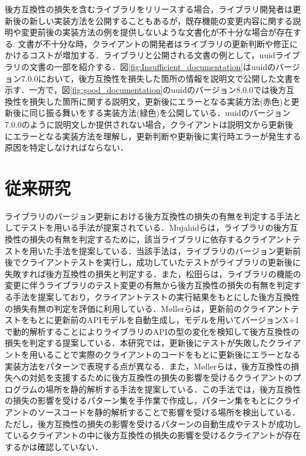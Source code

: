\documentclass[11pt]{jreport}
\begin{document}
後方互換性の損失を含むライブラリをリリースする場合，ライブラリ開発者は更新後の新しい実装方法を公開することもあるが，既存機能の変更内容に関する説明や変更前後の実装方法の例を提供しないような文書化が不十分な場合が存在する.
文書が不十分な時，クライアントの開発者はライブラリの更新判断や修正にかけるコストが増加する\cite{mostafa2017experience}．ライブラリと公開される文書の例として，uuidライブラリの文書の一部を紹介する．図\ref{fig:Insufficient_documentation}はuuidのバージョン7.0.0において，後方互換性を損失した箇所の情報を説明文で公開した文書を示す．一方で，図\ref{fig:good_documentation}のuuidのバージョン8.0.0では後方互換性を損失した箇所に関する説明文，更新後にエラーとなる実装方法(赤色)と更新後に同じ振る舞いをする実装方法(緑色)を公開している．uuidのバージョン7.0.0のように説明文しか提供されない場合，クライアントは説明文から更新後にエラーとなる実装方法を理解し，更新判断や更新後に実行時エラーが発生する原因を特定しなければならない．


\section{従来研究}

ライブラリのバージョン更新における後方互換性の損失の有無を判定する手法としてテストを用いる手法が提案されている\cite{mujahid}\cite{matsuda}．Mujahidらは，ライブラリの後方互換性の損失の有無を判定するために，該当ライブラリに依存するクライアントテストを用いた手法を提案している\cite{mujahid}．当該手法は，ライブラリのバージョン更新前後でクライアントテストを実行し，成功していたテストがライブラリの更新後に失敗すれば後方互換性の損失と判定する．また，松田らは，ライブラリの機能の変更に伴うライブラリのテスト変更の有無から後方互換性の損失の有無を判定する手法を提案しており，クライアントテストの実行結果をもとにした後方互換性の損失有無の判定を評価に利用している\cite{matsuda}．M{\o}llerらは，更新前のクライアントテストをもとに更新前のAPIモデルを自動生成し，モデルを用いてバージョンX+1で動的解析することによりライブラリのAPIの型の変化を検知して後方互換性の損失を判定する提案している\cite{10.1145/3338906.3338940}．本研究では，更新後にテストが失敗したクライアントを用いることで実際のクライアントのコードをもとに更新後にエラーとなる実装方法をパターンで表現する点が異なる．また，M{\o}llerらは，後方互換性の損失への対処を支援するために後方互換性の損失の影響を受けるクライアントのプログラムの場所を静的解析する手法を提案している\cite{10.1145/3428255}．この手法では，後方互換性の損失の影響を受けるパターン集を手作業で作成し，パターン集をもとにクライアントのソースコードを静的解析することで影響を受ける場所を検出している．ただし，後方互換性の損失の影響を受けるパターンの自動生成やテストが成功しているクライアントの中に後方互換性の損失の影響を受けるクライアントが存在するかは確認していない．
\end{document}
